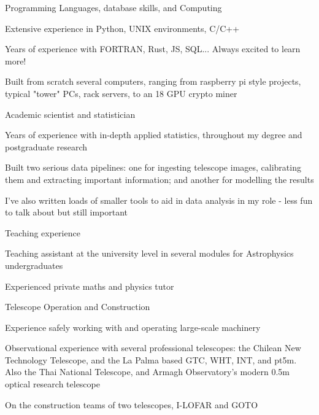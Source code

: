 \begin{cventries}
  \cventry
    {Programming Languages, database skills, and Computing}
    {}
    {}
    {}
    {
      \begin{cvitems}
        \item {Extensive experience in Python, UNIX environments, C/C++}
        \item {Years of experience with FORTRAN, Rust, JS, SQL... Always excited to learn more!}
        \item {Built from scratch several computers, ranging from raspberry pi style projects, typical "tower" PCs, rack servers, to an 18 GPU crypto miner}
      \end{cvitems}
    }

    \cventry
        {Academic scientist and statistician}
        {}
        {}
        {}
        {
        \begin{cvitems}
            \item {Years of experience with in-depth applied statistics, throughout my degree and postgraduate research}
            \item {Built two serious data pipelines: one for ingesting telescope images, calibrating them and extracting important information; and another for modelling the results}
            \item {I've also written loads of smaller tools to aid in data analysis in my role - less fun to talk about but still important}
        \end{cvitems}
        }
        
    \cventry
        {Teaching experience}
        {}
        {}
        {}
        {
        \begin{cvitems}
            \item {Teaching assistant at the university level in several modules for Astrophysics undergraduates}
            \item {Experienced private maths and physics tutor}
        \end{cvitems}
        }
        
        
  \cventry
    {Telescope Operation and Construction}
    {}
    {}
    {}
    {
      \begin{cvitems}
        \item {Experience safely working with and operating large-scale machinery}
        \item {Observational experience with several professional telescopes: the Chilean New Technology Telescope, and the La Palma based GTC, WHT, INT, and pt5m. Also the Thai National Telescope, and Armagh Observatory's modern 0.5m optical research telescope}
        \item {On the construction teams of two telescopes, I-LOFAR and GOTO}
      \end{cvitems}
    }
    

\end{cventries}
